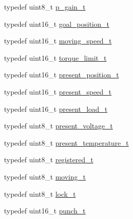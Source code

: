 \begin{DoxyCompactItemize}
\item 
typedef uint8\+\_\+t \hyperlink{structdynamixel_1_1servos_1_1_model_traits_3_01_mx106_01_4_1_1_c_t_a7ee89485c2c9e7a9810c9de69c4b6f5c}{p\+\_\+gain\+\_\+t}
\item 
typedef uint16\+\_\+t \hyperlink{structdynamixel_1_1servos_1_1_model_traits_3_01_mx106_01_4_1_1_c_t_ad8762c6959b7cd4f392fee8b21c21ab1}{goal\+\_\+position\+\_\+t}
\item 
typedef uint16\+\_\+t \hyperlink{structdynamixel_1_1servos_1_1_model_traits_3_01_mx106_01_4_1_1_c_t_a11b514fecd252690a34d69a0f8dda17a}{moving\+\_\+speed\+\_\+t}
\item 
typedef uint16\+\_\+t \hyperlink{structdynamixel_1_1servos_1_1_model_traits_3_01_mx106_01_4_1_1_c_t_a4df9388d71baa1cff9d216a92def8d73}{torque\+\_\+limit\+\_\+t}
\item 
typedef uint16\+\_\+t \hyperlink{structdynamixel_1_1servos_1_1_model_traits_3_01_mx106_01_4_1_1_c_t_a66df83d926066a6bd60894bb38d6ee13}{present\+\_\+position\+\_\+t}
\item 
typedef uint16\+\_\+t \hyperlink{structdynamixel_1_1servos_1_1_model_traits_3_01_mx106_01_4_1_1_c_t_a6869dd84d850b74581d5d11ec2c18995}{present\+\_\+speed\+\_\+t}
\item 
typedef uint16\+\_\+t \hyperlink{structdynamixel_1_1servos_1_1_model_traits_3_01_mx106_01_4_1_1_c_t_a9cf303c2fa27e491772613e7d0208916}{present\+\_\+load\+\_\+t}
\item 
typedef uint8\+\_\+t \hyperlink{structdynamixel_1_1servos_1_1_model_traits_3_01_mx106_01_4_1_1_c_t_a3d8b0c514e9887977f722d0eda6426e9}{present\+\_\+voltage\+\_\+t}
\item 
typedef uint8\+\_\+t \hyperlink{structdynamixel_1_1servos_1_1_model_traits_3_01_mx106_01_4_1_1_c_t_a79673bb4b999953ade394128ec93af1a}{present\+\_\+temperature\+\_\+t}
\item 
typedef uint8\+\_\+t \hyperlink{structdynamixel_1_1servos_1_1_model_traits_3_01_mx106_01_4_1_1_c_t_a25d5736b94a6d9888f8356153dff517c}{registered\+\_\+t}
\item 
typedef uint8\+\_\+t \hyperlink{structdynamixel_1_1servos_1_1_model_traits_3_01_mx106_01_4_1_1_c_t_a565de3f7b8c7055c3a0cad83cfb6858b}{moving\+\_\+t}
\item 
typedef uint8\+\_\+t \hyperlink{structdynamixel_1_1servos_1_1_model_traits_3_01_mx106_01_4_1_1_c_t_a41fcb08dbdd62746705a7c9b4facf9b3}{lock\+\_\+t}
\item 
typedef uint16\+\_\+t \hyperlink{structdynamixel_1_1servos_1_1_model_traits_3_01_mx106_01_4_1_1_c_t_aff12625b70b0f5a14450ed28dd1e8693}{punch\+\_\+t}

\end{DoxyCompactItemize}
